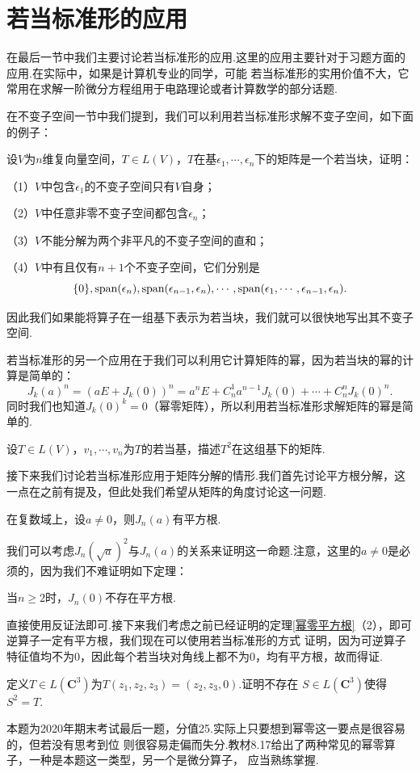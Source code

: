 \section{若当标准形的应用}
在最后一节中我们主要讨论若当标准形的应用.这里的应用主要针对于习题方面的应用.在实际中，如果是计算机专业的同学，可能
若当标准形的实用价值不大，它常用在求解一阶微分方程组用于电路理论或者计算数学的部分话题.

在不变子空间一节中我们提到，我们可以利用若当标准形求解不变子空间，如下面的例子：
\begin{example}
	设$V$为$n$维复向量空间，$T\in L(V)$，$T$在基$\epsilon_1,\cdots,\epsilon_n$下的矩阵是一个若当块，证明：

	\textup{（1）}$V$中包含$\epsilon_1$的不变子空间只有$V$自身；

	\textup{（2）}$V$中任意非零不变子空间都包含$\epsilon_n$；

	\textup{（3）}$V$不能分解为两个非平凡的不变子空间的直和；

	\textup{（4）}$V$中有且仅有$n+1$个不变子空间，它们分别是$$\{0\},\textup{span}(\epsilon_n),
	\textup{span}(\epsilon_{n-1},\epsilon_n),\cdots,\textup{span}(\epsilon_1,\cdots,\epsilon_{n-1},\epsilon_n).$$
\end{example}
因此我们如果能将算子在一组基下表示为若当块，我们就可以很快地写出其不变子空间.

若当标准形的另一个应用在于我们可以利用它计算矩阵的幂，因为若当块的幂的计算是简单的：
$$J_k(a)^n=(aE+J_k(0))^n=a^nE+C_n^1a^{n-1}J_k(0)+\cdots+C_n^nJ_k(0)^n.$$
同时我们也知道$J_k(0)^k=0$（幂零矩阵），所以利用若当标准形求解矩阵的幂是简单的.
\begin{example}
	设$T\in L(V)$，$v_1,\cdots,v_n$为$T$的若当基，描述$T^2$在这组基下的矩阵.
\end{example}
接下来我们讨论若当标准形应用于矩阵分解的情形.我们首先讨论平方根分解，这一点在之前有提及，但此处我们希望从矩阵的角度讨论这一问题.
\begin{theorem}
	在复数域上，设$a\neq 0$，则$J_n(a)$有平方根.
\end{theorem}
我们可以考虑$J_n(\sqrt{a})^2$与$J_n(a)$的关系来证明这一命题.注意，这里的$a\neq 0$是必须的，因为我们不难证明如下定理：
\begin{theorem}
	当$n\ge 2$时，$J_n(0)$不存在平方根.
\end{theorem}
直接使用反证法即可.接下来我们考虑之前已经证明的定理\ref{幂零平方根}（2），即可逆算子一定有平方根，我们现在可以使用若当标准形的方式
证明，因为可逆算子特征值均不为0，因此每个若当块对角线上都不为0，均有平方根，故而得证.
\begin{example}
	定义$T\in L(\mathbf{C}^3)$为$T(z_1,z_2,z_3)=(z_2,z_3,0)$.证明不存在
	$S\in L(\mathbf{C}^3)$使得$S^2=T$.
\end{example}
本题为2020年期末考试最后一题，分值25.实际上只要想到幂零这一要点是很容易的，但若没有思考到位
则很容易走偏而失分.教材8.17给出了两种常见的幂零算子，一种是本题这一类型，另一个是微分算子，
应当熟练掌握.

